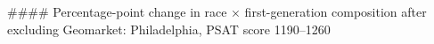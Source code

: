 #### Percentage-point change in race × first-generation composition after excluding Geomarket: Philadelphia, PSAT score 1190–1260
